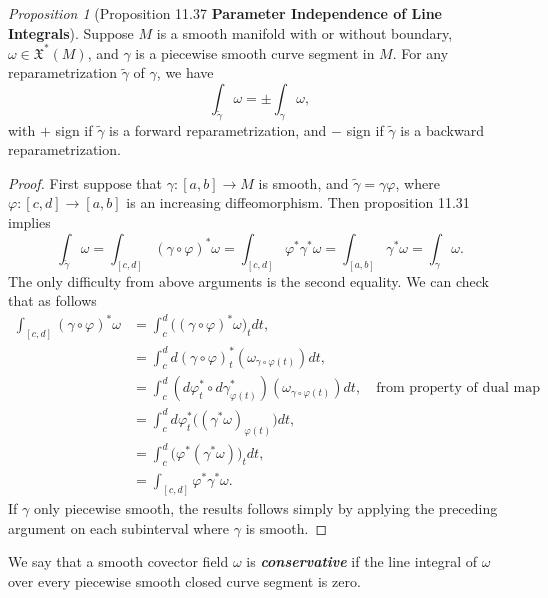 \documentclass[a4paper]{article}
\theoremstyle{remark}
\newtheorem{prop}{Proposition}
\newcommand{\VF}{\mathfrak{X}} %
\newcommand\wtilde[1]{\widetilde{#1}} %
\begin{document}
\begin{prop}[Proposition 11.37 \textbf{Parameter Independence of Line Integrals}]
Suppose $M$ is a smooth manifold with or without boundary, $\omega \in \VF^*(M)$, and $\gamma$ is a piecewise smooth curve segment in $M$. For any reparametrization $\wtilde{\gamma}$ of $\gamma$, we have 
$$
\int_{\wtilde{\gamma}} \omega = \pm \int_{\gamma} \omega,
$$
with $+$ sign if $\wtilde{\gamma}$ is a forward reparametrization, and $-$ sign if $\wtilde{\gamma}$ is a backward reparametrization.
\end{prop}
\begin{proof}
First suppose that $\gamma : [a,b] \to M$ is smooth, and $\wtilde{\gamma} = \gamma \varphi$, where $\varphi : [c,d] \to [a,b]$ is an increasing diffeomorphism. Then proposition 11.31 implies
$$
\int_{\wtilde{\gamma}} \omega = \int_{[c,d]} (\gamma \circ \varphi)^* \omega = \int_{[c,d]} \varphi^*\gamma^*\omega = \int_{[a,b]} \gamma^*\omega = \int_{\gamma} \omega.
$$
The only difficulty from above arguments is the second equality. We can check that as follows
\begin{align*}
\int_{[c,d]} (\gamma \circ \varphi)^* \omega &= \int_c^d \big( (\gamma \circ \varphi)^* \omega \big)_t dt, \\ &= \int_c^d d(\gamma \circ \varphi)^*_t (\omega_{\gamma \circ \varphi (t)}) dt, \\ &= \int_c^d (d\varphi_t^* \circ d\gamma_{\varphi(t)}^* )(\omega_{\gamma \circ \varphi(t)}) dt, \quad \text{from property of dual map} \\&= \int_c^d d\varphi_t^* \big(( \gamma^* \omega )_{\varphi(t)}\big) dt, \\ &=\int_c^d \big(\varphi^* (\gamma^* \omega) \big)_t dt, \\ &= \int_{[c,d]}\varphi^*\gamma^*\omega.
\end{align*}
If $\gamma$ only piecewise smooth, the results follows simply by applying the preceding argument on each subinterval where $\gamma$ is smooth. 
\end{proof}

We say that a smooth covector field $\omega$ is \textit{\textbf{conservative}} if the line integral of $\omega$ over every piecewise smooth closed curve segment is zero.
\end{document}
